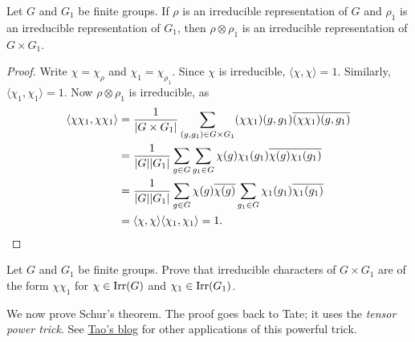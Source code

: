 \begin{lemma}
    Let $G$ and $G_1$ be finite groups. If $\rho$ is an irreducible
    representation of $G$ and $\rho_1$ is an irreducible representation
    of $G_1$, then 
    $\rho\otimes\rho_1$ is an irreducible representation of $G\times G_1$. 
\end{lemma}

\begin{proof}
    Write $\chi=\chi_{\rho}$ and $\chi_1=\chi_{\rho_1}$. Since
    $\chi$ is irreducible, $\langle\chi,\chi\rangle=1$. Similarly, 
    $\langle\chi_1,\chi_1\rangle=1$. Now
    $\rho\otimes\rho_1$ is irreducible, as 
    \begin{align*}
    \langle\chi\chi_1,\chi\chi_1\rangle
    &=\frac{1}{|G\times G_1|}\sum_{(g,g_1)\in G\times G_1}(\chi\chi_1)(g,g_1)\overline{(\chi\chi_1)(g,g_1)}\\
    &=\frac{1}{|G||G_1|}\sum_{g\in G}\sum_{g_1\in G}\chi(g)\chi_1(g_1)\overline{\chi(g)}\overline{\chi_1(g_1)}\\
    &=\frac{1}{|G||G_1|}\sum_{g\in G}\chi(g)\overline{\chi(g)}\sum_{g_1\in G}\chi_1(g_1)\overline{\chi_1(g_1)}\\
    &=\langle\chi,\chi\rangle\langle\chi_1,\chi_1\rangle=1.\qedhere 
    \end{align*}
\end{proof}

\begin{exercise}
    Let $G$ and $G_1$ be finite groups. 
    Prove that irreducible characters of $G\times G_1$ 
    are of the form $\chi\chi_1$ for  
    $\chi\in\operatorname{Irr}(G)$ and $\chi_1\in\operatorname{Irr}(G_1)$. 
\end{exercise}

We now prove Schur's theorem. The proof goes back to Tate; it uses the 
\emph{tensor power trick}. See
\href{https://terrytao.wordpress.com}{Tao's blog} for other applications of this powerful
trick. 

